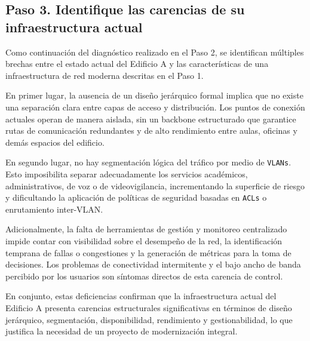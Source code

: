 \subsection*{Paso 3. Identifique las carencias de su infraestructura actual}

Como continuación del diagnóstico realizado en el Paso 2, se identifican múltiples brechas entre el estado actual del Edificio A y las características de una infraestructura de red moderna descritas en el Paso 1.

En primer lugar, la ausencia de un diseño jerárquico formal implica que no existe una separación clara entre capas de acceso y distribución. Los puntos de conexión actuales operan de manera aislada, sin un backbone estructurado que garantice rutas de comunicación redundantes y de alto rendimiento entre aulas, oficinas y demás espacios del edificio.

En segundo lugar, no hay segmentación lógica del tráfico por medio de \texttt{VLANs}. Esto imposibilita separar adecuadamente los servicios académicos, administrativos, de voz o de videovigilancia, incrementando la superficie de riesgo y dificultando la aplicación de políticas de seguridad basadas en \texttt{ACLs} o enrutamiento inter-VLAN.

Adicionalmente, la falta de herramientas de gestión y monitoreo centralizado impide contar con visibilidad sobre el desempeño de la red, la identificación temprana de fallas o congestiones y la generación de métricas para la toma de decisiones. Los problemas de conectividad intermitente y el bajo ancho de banda percibido por los usuarios son síntomas directos de esta carencia de control.

En conjunto, estas deficiencias confirman que la infraestructura actual del Edificio A presenta carencias estructurales significativas en términos de diseño jerárquico, segmentación, disponibilidad, rendimiento y gestionabilidad, lo que justifica la necesidad de un proyecto de modernización integral.